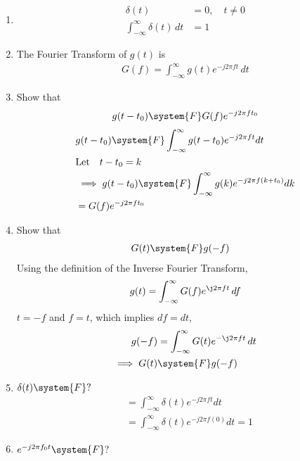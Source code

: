 \documentclass[journal,12pt,twocolumn]{IEEEtran}
\renewcommand\thesection{\arabic{section}}
\begin{document}
\begin{enumerate}[label=\thesection.\arabic*
,ref=\thesection.\theenumi]
\item 
	\begin{align}
		\delta(t)&=0, \quad t\neq0
\\
		\int_{-\infty}^{\infty}\delta(t) \, dt&= 1
	\end{align}
 \item The Fourier Transform of $g(t)$ is
 \begin{align}
 G(f)=\int_{-\infty}^{\infty}g(t)e^{-j2\pi ft}\,dt
 \end{align}
 \item Show that 
 \begin{align}
	 g(t-t_0)&\system{F}G(f)e^{-j2\pi ft_0}\\
 \end{align}
 \solution 
 \begin{align}
     &g(t-t_0)\system{F}\int_{-\infty}^{\infty}g(t-t_0)e^{-j2\pi ft}dt\\
    &\text{Let}\quad t-t_0=k\\
    &\implies g(t-t_0)\system{F}\int_{-\infty}^{\infty}g(k)e^{-j2\pi f(k+t_0)} dk\\
    &=G(f)e^{-j2\pi ft_0}
 \end{align}
 \item Show that 
 \begin{align}
	 G(t)&\system{F}g(-f)
 \end{align}
 \solution Using the definition of the Inverse Fourier Transform,
\begin{align}
    g(t)=\int_{-\infty}^{\infty}G(f)e^{\j2\pi ft}\,df
\end{align}
 $t =-f$ and $f = t$, which implies $df = dt$,
\begin{align}
    g(-f)&=\int_{-\infty}^{\infty}G(t)e^{-\j2\pi ft}\,dt \\
    \implies G(t)&\system{F}g(-f)
\end{align}
 \item $\delta(t)\system{F}?$\\
     \solution \begin{align}
         &=\int_{-\infty}^{\infty} \delta(t) e^{-j2\pi ft}dt\\
         &=\int_{-\infty}^{\infty}\delta(t) e^{-j2\pi f(0)}dt=1
     \end{align}
 \item $e^{-j2\pi f_0t}\system{F}?$\\
     \solution \begin{align}

\end{align}
\end{enumerate}
\end{document}
